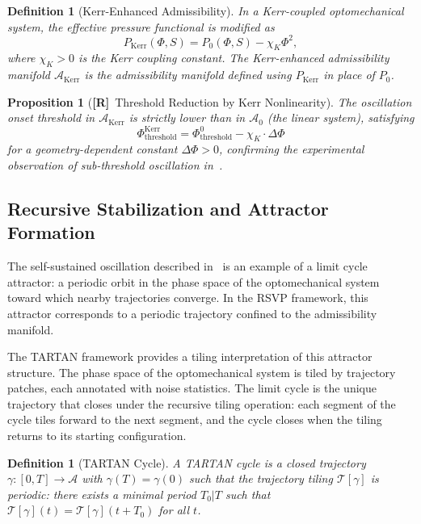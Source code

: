 \documentclass[11pt, oneside]{article}
\numberwithin{equation}{section}
\newcommand{\ClaimR}{\textcolor{rsvpblue}{\textbf{[R]}}}
\theoremstyle{rsvpstyle}
\newtheorem{proposition}[theorem]{Proposition}
\newtheorem{definition}[theorem]{Definition}
\theoremstyle{remark}
\newcommand{\Adm}{\mathcal{A}}
\begin{document}
\begin{definition}[Kerr-Enhanced Admissibility]
In a Kerr-coupled optomechanical system, the effective pressure functional is modified as
\begin{equation}
  P_\text{Kerr}(\Phi, S) = P_0(\Phi, S) - \chi_K \Phi^2,
\end{equation}
where $\chi_K > 0$ is the Kerr coupling constant. The Kerr-enhanced admissibility
manifold $\Adm_\text{Kerr}$ is the admissibility manifold defined using $P_\text{Kerr}$
in place of $P_0$.
\end{definition}

\begin{proposition}[\ClaimR\ Threshold Reduction by Kerr Nonlinearity]
The oscillation onset threshold in $\Adm_\text{Kerr}$ is strictly lower than in
$\Adm_0$ (the linear system), satisfying
\begin{equation}
  \Phi_\text{threshold}^\text{Kerr} = \Phi_\text{threshold}^0 - \chi_K \cdot \Delta\Phi
\end{equation}
for a geometry-dependent constant $\Delta\Phi > 0$, confirming the experimental
observation of sub-threshold oscillation in~\cite{Dhiman2026Optomechanics}.
\end{proposition}

\subsection{Recursive Stabilization and Attractor Formation}

The self-sustained oscillation described in~\cite{Dhiman2026Optomechanics} is an
example of a limit cycle attractor: a periodic orbit in the phase space of the
optomechanical system toward which nearby trajectories converge. In the RSVP framework,
this attractor corresponds to a periodic trajectory confined to the admissibility manifold.

The TARTAN framework provides a tiling interpretation of this attractor structure.
The phase space of the optomechanical system is tiled by trajectory patches, each
annotated with noise statistics. The limit cycle is the unique trajectory that closes
under the recursive tiling operation: each segment of the cycle tiles forward to the
next segment, and the cycle closes when the tiling returns to its starting configuration.

\begin{definition}[TARTAN Cycle]
A TARTAN cycle is a closed trajectory $\gamma : [0,T] \to \Adm$ with $\gamma(T) = \gamma(0)$
such that the trajectory tiling $\mathcal{T}[\gamma]$ is periodic: there exists a minimal
period $T_0 | T$ such that $\mathcal{T}[\gamma](t) = \mathcal{T}[\gamma](t + T_0)$ for
all $t$.
\end{definition}
\end{document}
